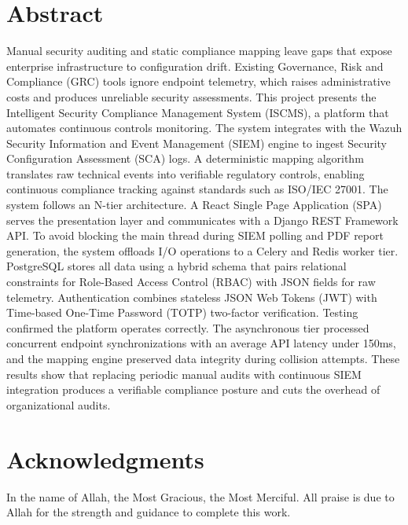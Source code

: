 \documentclass[11pt,a4paper,oneside,openright]{report}
\begin{document}
\chapter*{Abstract}
Manual security auditing and static compliance mapping leave gaps that expose enterprise infrastructure to configuration drift. Existing Governance, Risk and Compliance (GRC) tools ignore endpoint telemetry, which raises administrative costs and produces unreliable security assessments. This project presents the Intelligent Security Compliance Management System (ISCMS), a platform that automates continuous controls monitoring. The system integrates with the Wazuh Security Information and Event Management (SIEM) engine to ingest Security Configuration Assessment (SCA) logs. A deterministic mapping algorithm translates raw technical events into verifiable regulatory controls, enabling continuous compliance tracking against standards such as ISO/IEC 27001. The system follows an N-tier architecture. A React Single Page Application (SPA) serves the presentation layer and communicates with a Django REST Framework API. To avoid blocking the main thread during SIEM polling and PDF report generation, the system offloads I/O operations to a Celery and Redis worker tier. PostgreSQL stores all data using a hybrid schema that pairs relational constraints for Role-Based Access Control (RBAC) with JSON fields for raw telemetry. Authentication combines stateless JSON Web Tokens (JWT) with Time-based One-Time Password (TOTP) two-factor verification. Testing confirmed the platform operates correctly. The asynchronous tier processed concurrent endpoint synchronizations with an average API latency under 150ms, and the mapping engine preserved data integrity during collision attempts. These results show that replacing periodic manual audits with continuous SIEM integration produces a verifiable compliance posture and cuts the overhead of organizational audits.

\newpage
{}
{}
\chapter*{Acknowledgments}

In the name of Allah, the Most Gracious, the Most Merciful. All praise is due to Allah for the strength and guidance to complete this work.
\end{document}
